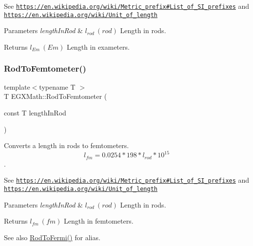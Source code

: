 See \href{https://en.wikipedia.org/wiki/Metric_prefix#List_of_SI_prefixes}{\tt https\+://en.\+wikipedia.\+org/wiki/\+Metric\+\_\+prefix\#\+List\+\_\+of\+\_\+\+S\+I\+\_\+prefixes} and \href{https://en.wikipedia.org/wiki/Unit_of_length}{\tt https\+://en.\+wikipedia.\+org/wiki/\+Unit\+\_\+of\+\_\+length} 
\begin{DoxyParams}{Parameters}
{\em length\+In\+Rod} & $ l_{rod}\ (rod)$ Length in rods. \\
\hline
\end{DoxyParams}
\begin{DoxyReturn}{Returns}
$ l_{Em}\ (Em)$ Length in exameters. 
\end{DoxyReturn}
\mbox{\label{group___e_g_x_math-_conversions-_length_conversions-_surveyors-_rod-_s_i_ga93c5626ebf87e3f15901731a1e2e9cb3}} 
\subsubsection{\texorpdfstring{Rod\+To\+Femtometer()}{RodToFemtometer()}}
{\footnotesize\ttfamily template$<$typename T $>$ \\
T E\+G\+X\+Math\+::\+Rod\+To\+Femtometer (\begin{DoxyParamCaption}\item[{const T}]{length\+In\+Rod }\end{DoxyParamCaption})}



Converts a length in rods to femtometers. \[ l_{fm}=0.0254 * 198 * l_{rod} * 10^{15} \]. 

See \href{https://en.wikipedia.org/wiki/Metric_prefix#List_of_SI_prefixes}{\tt https\+://en.\+wikipedia.\+org/wiki/\+Metric\+\_\+prefix\#\+List\+\_\+of\+\_\+\+S\+I\+\_\+prefixes} and \href{https://en.wikipedia.org/wiki/Unit_of_length}{\tt https\+://en.\+wikipedia.\+org/wiki/\+Unit\+\_\+of\+\_\+length} 
\begin{DoxyParams}{Parameters}
{\em length\+In\+Rod} & $ l_{rod}\ (rod)$ Length in rods. \\
\hline
\end{DoxyParams}
\begin{DoxyReturn}{Returns}
$ l_{fm}\ (fm)$ Length in femtometers. 
\end{DoxyReturn}
\begin{DoxySeeAlso}{See also}
\mbox{\hyperlink{group___e_g_x_math-_conversions-_length_conversions-_surveyors-_rod-_non-_s_i_ga8397c0761e32cb6cfa632854d26023a5}{Rod\+To\+Fermi()}} for alias. 
\end{DoxySeeAlso}
\mbox{\label{group___e_g_x_math-_conversions-_length_conversions-_surveyors-_rod-_s_i_ga01d170f936da7b474a5ef3d7b8628d11}} 
